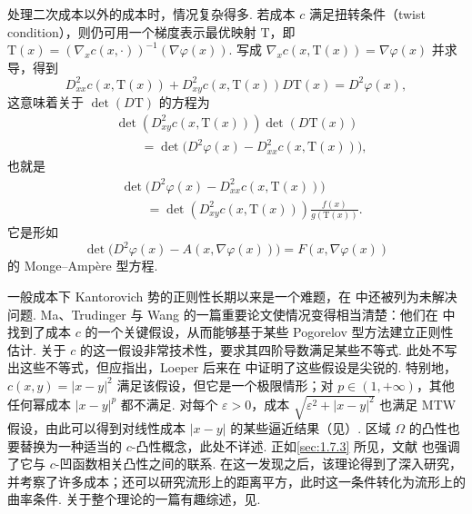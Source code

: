 处理二次成本以外的成本时，情况复杂得多. 若成本 $c$ 满足扭转条件（twist condition），则仍可用一个梯度表示最优映射 $\mathrm{T}$，即 $\mathrm{T}(x)=(\nabla_xc(x,\cdot))^{-1}(\nabla\varphi(x))$. 写成 $\nabla_xc(x,\mathrm{T}(x))=\nabla\varphi(x)$ 并求导，得到
\[
 D^2_{xx}c(x,\mathrm{T}(x))+D^2_{xy}c(x,\mathrm{T}(x))D\mathrm{T}(x)=D^2\varphi(x),
\]
这意味着关于 $\det(D\mathrm{T})$ 的方程为
\begin{equation*}
\begin{aligned}
 &\det(D^2_{xy}c(x,\mathrm{T}(x)))\det(D\mathrm{T}(x))\\
 &\qquad=\det\bigl(D^2\varphi(x)-D^2_{xx}c(x,\mathrm{T}(x))\bigr),
\end{aligned}
\end{equation*}
也就是
\begin{equation*}
\begin{aligned}
 &\det\bigl(D^2\varphi(x)-D^2_{xx}c(x,\mathrm{T}(x))\bigr)\\
 &\qquad=\det(D^2_{xy}c(x,\mathrm{T}(x)))\frac{f(x)}{g(\mathrm{T}(x))}.
\end{aligned}
\end{equation*}
它是形如
\[
 \det\bigl(D^2\varphi(x)-A(x,\nabla\varphi(x))\bigr)
   =F(x,\nabla\varphi(x))
\]
的 Monge--Amp\`ere 型方程.

\label{idx:i153-p56}
\label{idx:i96-p56}
\label{idx:i83-p56}
一般成本下 Kantorovich 势的正则性长期以来是一个难题，在\cite{b292} 中还被列为未解决问题. Ma、Trudinger 与 Wang 的一篇重要论文使情况变得相当清楚：他们在\cite{b219} 中找到了成本 $c$ 的一个关键假设，从而能够基于某些 Pogorelov 型方法建立正则性估计. 关于 $c$ 的这一假设非常技术性，要求其四阶导数满足某些不等式. 此处不写出这些不等式，但应指出，Loeper 后来在\cite{b216} 中证明了这些假设是尖锐的. 特别地，$c(x,y)=|x-y|^2$ 满足该假设，但它是一个极限情形；对 $p\in(1,+\infty)$，其他任何幂成本 $|x-y|^p$ 都不满足. 对每个 $\varepsilon>0$，成本 $\sqrt{\varepsilon^2+|x-y|^2}$ 也满足 MTW 假设，由此可以得到对线性成本 $|x-y|$ 的某些逼近结果（见\cite{b210}）. 区域 $\Omega$ 的凸性也要替换为一种适当的 $c$-凸性概念，此处不详述. 正如\autoref{sec:1.7.3} 所见，文献\cite{b168} 也强调了它与 $c$-凹函数相关凸性之间的联系. 在这一发现之后，该理论得到了深入研究，并考察了许多成本；还可以研究流形上的距离平方，此时这一条件转化为流形上的曲率条件. 关于整个理论的一篇有趣综述，见\cite{b164}.

